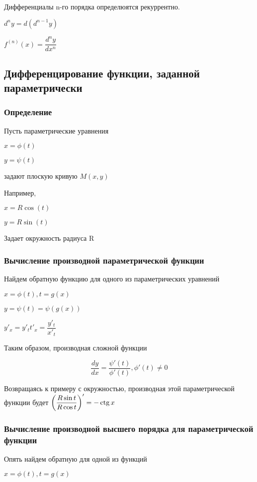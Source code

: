 Дифференциалы n-го порядка определюятся рекуррентно.

$ d^{n}y = d(d^{n-1}y) $	

$ f^{(n)}(x) = \dfrac{d^{n}y}{dx^{n}} $

\subsection{Дифференцирование функции, заданной параметрически}


\subsubsection{Определение}

Пусть параметрические уравнения

$ x = \phi(t) $

$ y = \psi(t) $

задают плоскую кривую $ M(x,y) $

Например,

$ x = R \cos(t) $

$ y = R \sin(t) $

Задает окружность радиуса R

\subsubsection{Вычисление производной параметрической функции}

Найдем обратную функцию для одного из параметрических уравнений

$ x = \phi(t), t = g(x) $

$ y = \psi(t) = \psi( g(x) ) $

$ y'_{x} = y'_{t} t'_{x} = \dfrac{y'_{t}}{x'_{t}} $

Таким образом, производная сложной функции

$$ 
\dfrac{dy}{dx} = \dfrac{\psi'(t)}{\phi'(t)}, \phi'(t) \ne 0
$$

Возвращаясь к примеру с окружностью, производная этой параметрической функции будет 
$ \left( \dfrac{R \sin t}{R \cos t} \right)' =  -\operatorname{ctg} x $

\subsubsection{Вычисление производной высшего порядка для параметрической функции}

Опять найдем обратную для одной из функций

$ x = \phi(t), t = g(x) $

